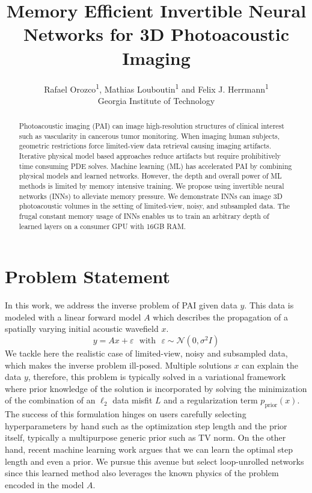 \documentclass[]{article}
\title{Memory Efficient Invertible Neural Networks for 3D Photoacoustic Imaging}
\author{Rafael Orozco\textsuperscript{1}, Mathias Louboutin\textsuperscript{1}
and Felix J. Herrmann\textsuperscript{1}\\Georgia Institute of
Technology\\}
\date{}
\begin{document}
\maketitle
\begin{abstract}
Photoacoustic imaging (PAI) can image high-resolution structures of
clinical interest such as vascularity in cancerous tumor monitoring.
When imaging human subjects, geometric restrictions force limited-view
data retrieval causing imaging artifacts. Iterative physical model based
approaches reduce artifacts but require prohibitively time consuming PDE
solves. Machine learning (ML) has accelerated PAI by combining physical
models and learned networks. However, the depth and overall power of ML
methods is limited by memory intensive training. We propose using
invertible neural networks (INNs) to alleviate memory pressure. We
demonstrate INNs can image 3D photoacoustic volumes in the setting of
limited-view, noisy, and subsampled data. The frugal constant memory
usage of INNs enables us to train an arbitrary depth of learned layers
on a consumer GPU with 16GB RAM.
\end{abstract}

\section{Problem Statement}\label{problem-statement}

In this work, we address the inverse problem of PAI given data $y$. This
data is modeled with a linear forward model $A$ which describes the
propagation of a spatially varying initial acoustic wavefield $x$.
%
\begin{equation}
y = Ax + \varepsilon \, \, \, \, \text{with} \, \, \, \, \varepsilon \sim \mathcal{N}(0,\sigma^2 I)
\label{eq:problem}
\end{equation}
%
 We tackle here the realistic case of limited-view, noisy and subsampled
data, which makes the inverse problem ill-posed. Multiple solutions $x$
can explain the data $y$, therefore, this problem is typically solved in
a variational framework where prior knowledge of the solution is
incorporated by solving the minimization of the combination of an
$\ell_2$ data misfit $L$ and a regularization term
$p_{\mathrm{prior}}(x)$. The success of this formulation hinges on users
carefully selecting hyperparameters by hand such as the optimization
step length and the prior itself, typically a multipurpose generic prior
such as TV norm. On the other hand, recent machine learning work argues
that we can learn the optimal step length and even a prior. We pursue
this avenue but select loop-unrolled networks since this learned method
also leverages the known physics of the problem encoded in the model
$A$.
\end{document}
